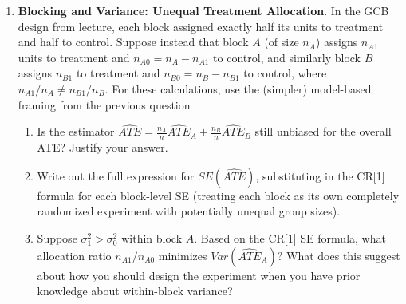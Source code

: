 \documentclass[
  letterpaper,
  DIV=11,
  numbers=noendperiod]{scrartcl}
\begin{document}
\begin{enumerate}
\def\labelenumi{\arabic{enumi}.}
\setcounter{enumi}{5}
\item
  \textbf{Blocking and Variance: Unequal Treatment Allocation}. In the
  GCB design from lecture, each block assigned exactly half its units to
  treatment and half to control. Suppose instead that block \(A\) (of
  size \(n_A\)) assigns \(n_{A1}\) units to treatment and
  \(n_{A0} = n_A - n_{A1}\) to control, and similarly block \(B\)
  assigns \(n_{B1}\) to treatment and \(n_{B0} = n_B - n_{B1}\) to
  control, where \(n_{A1}/n_A \neq n_{B1}/n_B\). For these calculations,
  use the (simpler) model-based framing from the previous question

  \begin{enumerate}
  \def\labelenumii{\alph{enumii}.}
  \item
    Is the estimator
    \(\widehat{ATE} = \frac{n_A}{n}\widehat{ATE}_A + \frac{n_B}{n}\widehat{ATE}_B\)
    still unbiased for the overall ATE? Justify your answer.
  \item
    Write out the full expression for \(SE(\widehat{ATE})\),
    substituting in the CR{[}1{]} formula for each block-level SE
    (treating each block as its own completely randomized experiment
    with potentially unequal group sizes).
  \item
    Suppose \(\sigma_1^2 > \sigma_0^2\) within block \(A\). Based on the
    CR{[}1{]} SE formula, what allocation ratio \(n_{A1}/n_{A0}\)
    minimizes \(Var(\widehat{ATE}_A)\)? What does this suggest about how
    you should design the experiment when you have prior knowledge about
    within-block variance?
  \end{enumerate}
\end{enumerate}
\end{document}
